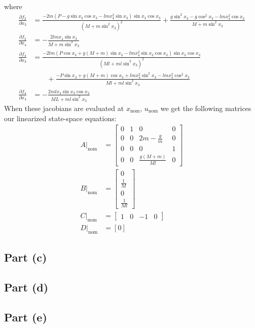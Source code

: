 \documentclass[11pt]{article}
\begin{document}
where
\begin{align*}
	\frac{\partial f_2}{\partial x_3} &= \frac{-2m(P-g\sin x_3\cos x_3-lmx_4^2\sin x_3)\sin x_3 \cos x_3}{(M+m\sin^2x_3)^2} + \frac{g\sin^2x_3 - g\cos^2x_3 - lmx_4^2\cos x_3}{M+m\sin^2x_3} \\
	\frac{\partial f_2}{\partial x_4} &= -\frac{2lmx_4\sin x_3}{M+m\sin^2x_3} \\
	\frac{\partial f_4}{\partial x_3} &= \frac{-2lm(P\cos x_3 + g(M+m)\sin x_3 - lmx_4^2\sin x_3 \cos x_3)\sin x_3 \cos x_3}{(Ml + ml\sin^2x_3)^2} \\ &\qquad + \frac{-P\sin x_3 + g(M+m)\cos x_3 + lmx_4^2\sin^2x_3 - lmx_4^2\cos^2x_3}{Ml + ml\sin^2x_3} \\
	\frac{\partial f_4}{\partial x_4} &= -\frac{2mlx_4\sin x_3 \cos x_3}{ML + ml\sin^2x_3}
\end{align*}
When these jacobians are evaluated at $x_\text{nom}$, $u_\text{nom}$ we get the following matrices our linearized state-space equations:
\begin{align*}
	A|_\text{nom} &= \begin{bmatrix} 
					0 & 1 & 0 & 0 \\ 
					0 & 0 & 2m-\frac{g}{m} & 0 \\
					0 & 0 & 0 & 1 \\ 
					0 & 0 & \frac{g(M+m)}{Ml} & 0 \end{bmatrix} \\
	B|_\text{nom} &= \begin{bmatrix} 
					0 \\ \frac{1}{M} \\ 0 \\ \frac{1}{Ml} 
					\end{bmatrix} \\
	C|_\text{nom} &= \begin{bmatrix}
					1 & 0 & -1 & 0 \end{bmatrix} \\
	D|_\text{nom} &= [0]
\end{align*}

\subsection*{Part (c)}
\subsection*{Part (d)}
\subsection*{Part (e)}
\end{document}
